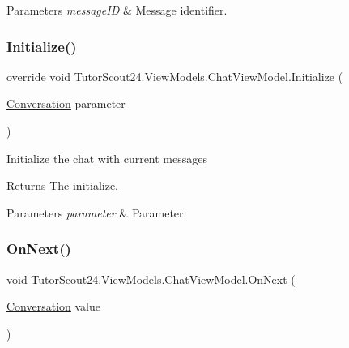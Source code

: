 \begin{DoxyParams}{Parameters}
{\em message\+ID} & Message identifier.\\
\hline
\end{DoxyParams}
\mbox{\label{class_tutor_scout24_1_1_view_models_1_1_chat_view_model_ad47d924ce1ce699407a990b361813b40}} 
\subsubsection{\texorpdfstring{Initialize()}{Initialize()}}
{\footnotesize\ttfamily override void Tutor\+Scout24.\+View\+Models.\+Chat\+View\+Model.\+Initialize (\begin{DoxyParamCaption}\item[{\mbox{\hyperlink{class_tutor_scout24_1_1_models_1_1_chat_1_1_conversation}{Conversation}}}]{parameter }\end{DoxyParamCaption})\hspace{0.3cm}{\ttfamily [inline]}}



Initialize the chat with current messages ~\newline


\begin{DoxyReturn}{Returns}
The initialize.
\end{DoxyReturn}

\begin{DoxyParams}{Parameters}
{\em parameter} & Parameter.\\
\hline
\end{DoxyParams}
\mbox{\label{class_tutor_scout24_1_1_view_models_1_1_chat_view_model_aeec126e30abb6c8b598f2e6654c1b6a9}} 
\subsubsection{\texorpdfstring{On\+Next()}{OnNext()}}
{\footnotesize\ttfamily void Tutor\+Scout24.\+View\+Models.\+Chat\+View\+Model.\+On\+Next (\begin{DoxyParamCaption}\item[{\mbox{\hyperlink{class_tutor_scout24_1_1_models_1_1_chat_1_1_conversation}{Conversation}}}]{value }\end{DoxyParamCaption})\hspace{0.3cm}{\ttfamily [inline]}}



